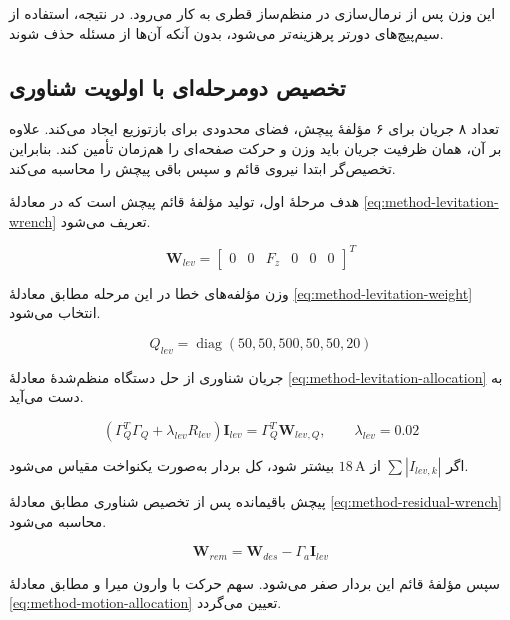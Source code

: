 این وزن پس از نرمال‌سازی در منظم‌ساز قطری به کار می‌رود. در نتیجه، استفاده از سیم‌پیچ‌های دورتر پرهزینه‌تر می‌شود، بدون آنکه آن‌ها از مسئله حذف شوند.

\subsection{تخصیص دومرحله‌ای با اولویت شناوری}

تعداد ۸ جریان برای ۶ مؤلفهٔ پیچش، فضای محدودی برای بازتوزیع ایجاد می‌کند. علاوه بر آن، همان ظرفیت جریان باید وزن و حرکت صفحه‌ای را هم‌زمان تأمین کند. بنابراین تخصیص‌گر ابتدا نیروی قائم و سپس باقی پیچش را محاسبه می‌کند.

هدف مرحلهٔ اول، تولید مؤلفهٔ قائم پیچش است که در معادلهٔ \ref{eq:method-levitation-wrench} تعریف می‌شود.

\begin{equation}
	\mathbf W_{lev}=\begin{bmatrix}0&0&F_z&0&0&0\end{bmatrix}^{T}
	\label{eq:method-levitation-wrench}
\end{equation}

وزن مؤلفه‌های خطا در این مرحله مطابق معادلهٔ \ref{eq:method-levitation-weight} انتخاب می‌شود.

\begin{equation}
	Q_{lev}=\operatorname{diag}(50,50,500,50,50,20)
	\label{eq:method-levitation-weight}
\end{equation}

جریان شناوری از حل دستگاه منظم‌شدهٔ معادلهٔ \ref{eq:method-levitation-allocation} به دست می‌آید.

\begin{equation}
	(\Gamma_Q^T\Gamma_Q+\lambda_{lev}R_{lev})\mathbf I_{lev}
	=\Gamma_Q^T\mathbf W_{lev,Q},
	\qquad \lambda_{lev}=0.02
	\label{eq:method-levitation-allocation}
\end{equation}

اگر $\sum|I_{lev,k}|$ از $18\,\mathrm A$ بیشتر شود، کل بردار به‌صورت یکنواخت مقیاس می‌شود.

پیچش باقیمانده پس از تخصیص شناوری مطابق معادلهٔ \ref{eq:method-residual-wrench} محاسبه می‌شود.

\begin{equation}
	\mathbf W_{rem}=\mathbf W_{des}-\Gamma_a\mathbf I_{lev}
	\label{eq:method-residual-wrench}
\end{equation}

سپس مؤلفهٔ قائم این بردار صفر می‌شود. سهم حرکت با وارون میرا و مطابق معادلهٔ \ref{eq:method-motion-allocation} تعیین می‌گردد.

